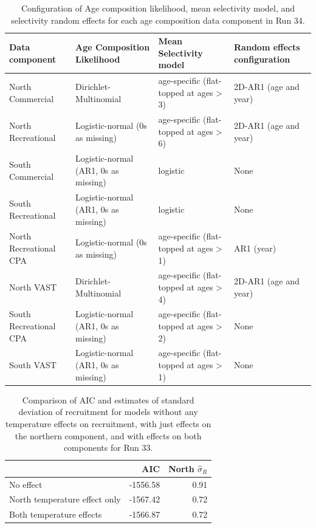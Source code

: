 \documentclass[
]{article}
\begin{document}
\begin{landscape}\begin{table}

\caption{\label{tab:age-comp-sel-table}Configuration of Age composition likelihood, mean selectivity model, and selectivity random effects for each age composition data component in Run 34.}
\centering
\begin{tabular}[t]{llll}
\toprule
Data component & Age Composition Likelihood & Mean Selectivity model & Random effects configuration\\
\midrule
North Commercial & Dirichlet-Multinomial & age-specific (flat-topped at ages > 3) & 2D-AR1 (age and year)\\
North Recreational & Logistic-normal (0s as missing) & age-specific (flat-topped at ages > 6) & 2D-AR1 (age and year)\\
South Commercial & Logistic-normal (AR1, 0s as missing) & logistic & None\\
South Recreational & Logistic-normal (AR1, 0s as missing) & logistic & None\\
North Recreational CPA & Logistic-normal (0s as missing) & age-specific (flat-topped at ages > 1) & AR1 (year)\\
\addlinespace
North VAST & Dirichlet-Multinomial & age-specific (flat-topped at ages > 4) & 2D-AR1 (age and year)\\
South Recreational CPA & Logistic-normal (AR1, 0s as missing) & age-specific (flat-topped at ages > 2) & None\\
South VAST & Logistic-normal (AR1, 0s as missing) & age-specific (flat-topped at ages > 1) & None\\
\bottomrule
\end{tabular}
\end{table}
\end{landscape}

\clearpage

\begin{table}

\caption{\label{tab:compare-table}Comparison of AIC and estimates of standard deviation of recruitment for models without any temperature effects on recruitment, with just effects on the northern component, and with effects on both components for Run 33.}
\centering
\begin{tabular}[t]{lrr}
\toprule
  & AIC & North $\widehat{\sigma}_R$\\
\midrule
No effect & -1556.58 & 0.91\\
North temperature effect only & -1567.42 & 0.72\\
Both temperature effects & -1566.87 & 0.72\\
\bottomrule
\end{tabular}
\end{table}
\clearpage
\end{document}
